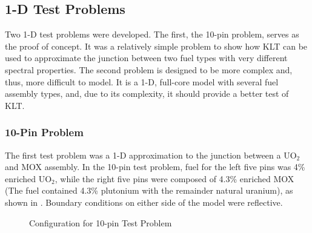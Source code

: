 \subsection{1-D Test Problems}

Two 1-D test problems were developed.  The first, the 10-pin problem, serves as 
the proof of concept.  It was a relatively simple problem to show how KLT can be used to 
approximate the junction between two fuel types with very different spectral 
properties.  The second problem is designed to be more complex and, thus, more 
difficult to model.  It is a 1-D, full-core model with several fuel assembly types, and, due to its 
complexity, it should provide a better test of KLT.

\subsubsection*{10-Pin Problem}

The first test problem was a 1-D approximation to the junction between a UO$_2$  
and MOX assembly. In the 10-pin test problem, fuel for the left five pins was 
4\% enriched UO$_2$, while the right five pins were composed of 
4.3\% enriched MOX (The fuel contained 4.3\% plutonium with the remainder 
natural uranium), as shown in  
. Boundary conditions on either side of the model were 
reflective. 

\begin{figure*}[htb]
    \centering
    \caption{Configuration for 10-pin Test Problem}
    \label{fig:10-pin_config}
\end{figure*}

